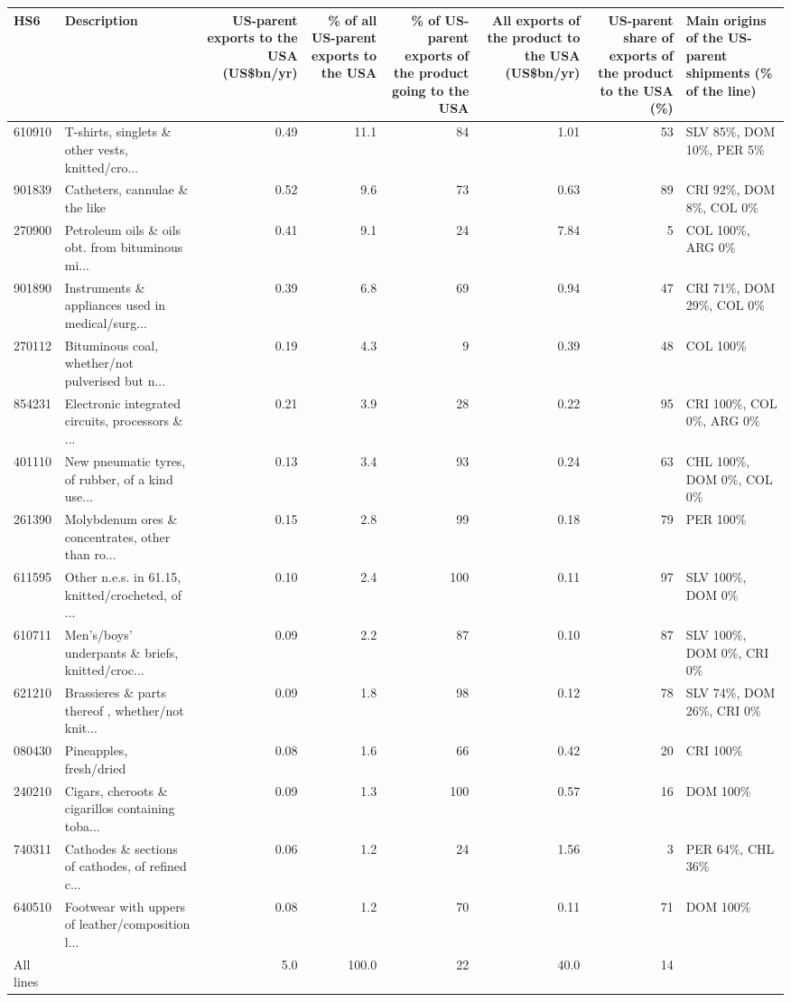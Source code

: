 \begin{tabular}{llrrrrrl}
\toprule
HS6 & Description & \multicolumn{1}{p{1.7cm}}{\raggedright US-parent exports to the USA (US\$bn/yr)} & \multicolumn{1}{p{1.7cm}}{\raggedright \% of all US-parent exports to the USA} & \multicolumn{1}{p{2.0cm}}{\raggedright \% of US-parent exports of the product going to the USA} & \multicolumn{1}{p{1.9cm}}{\raggedright All exports of the product to the USA (US\$bn/yr)} & \multicolumn{1}{p{2.2cm}}{\raggedright US-parent share of exports of the product to the USA (\%)} & \multicolumn{1}{p{2.6cm}}{\raggedright Main origins of the US-parent shipments (\% of the line)} \\
\midrule
610910 & T-shirts, singlets \& other vests, knitted/cro... & 0.49 & 11.1 & 84 & 1.01 & 53 & SLV 85\%, DOM 10\%, PER 5\% \\
901839 & Catheters, cannulae \& the like & 0.52 & 9.6 & 73 & 0.63 & 89 & CRI 92\%, DOM 8\%, COL 0\% \\
270900 & Petroleum oils \& oils obt. from bituminous mi... & 0.41 & 9.1 & 24 & 7.84 & 5 & COL 100\%, ARG 0\% \\
901890 & Instruments \& appliances used in medical/surg... & 0.39 & 6.8 & 69 & 0.94 & 47 & CRI 71\%, DOM 29\%, COL 0\% \\
270112 & Bituminous coal, whether/not pulverised but n... & 0.19 & 4.3 & 9 & 0.39 & 48 & COL 100\% \\
854231 & Electronic integrated circuits, processors \& ... & 0.21 & 3.9 & 28 & 0.22 & 95 & CRI 100\%, COL 0\%, ARG 0\% \\
401110 & New pneumatic tyres, of rubber, of a kind use... & 0.13 & 3.4 & 93 & 0.24 & 63 & CHL 100\%, DOM 0\%, COL 0\% \\
261390 & Molybdenum ores \& concentrates, other than ro... & 0.15 & 2.8 & 99 & 0.18 & 79 & PER 100\% \\
611595 & Other n.e.s. in 61.15, knitted/crocheted, of ... & 0.10 & 2.4 & 100 & 0.11 & 97 & SLV 100\%, DOM 0\% \\
610711 & Men's/boys' underpants \& briefs, knitted/croc... & 0.09 & 2.2 & 87 & 0.10 & 87 & SLV 100\%, DOM 0\%, CRI 0\% \\
621210 & Brassieres \& parts thereof , whether/not knit... & 0.09 & 1.8 & 98 & 0.12 & 78 & SLV 74\%, DOM 26\%, CRI 0\% \\
080430 & Pineapples, fresh/dried & 0.08 & 1.6 & 66 & 0.42 & 20 & CRI 100\% \\
240210 & Cigars, cheroots \& cigarillos containing toba... & 0.09 & 1.3 & 100 & 0.57 & 16 & DOM 100\% \\
740311 & Cathodes \& sections of cathodes, of refined c... & 0.06 & 1.2 & 24 & 1.56 & 3 & PER 64\%, CHL 36\% \\
640510 & Footwear with uppers of leather/composition l... & 0.08 & 1.2 & 70 & 0.11 & 71 & DOM 100\% \\
\midrule
All lines & & 5.0 & 100.0 & 22 & 40.0 & 14 & \\
\bottomrule
\end{tabular}
